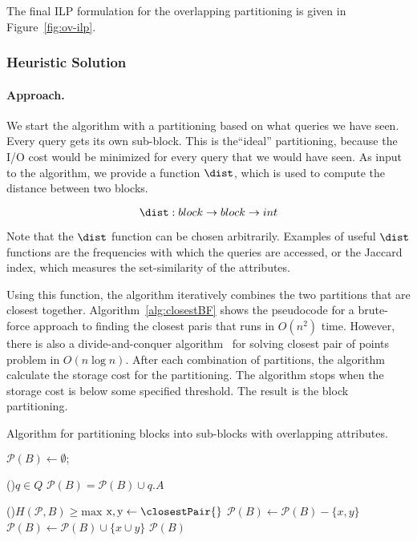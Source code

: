 The final ILP formulation for the overlapping partitioning is given in
Figure~\ref{fig:ov-ilp}.

\subsubsection{Heuristic Solution}

\paragraph*{Approach.$\,$} We start the algorithm with a 
 partitioning based on what queries we have seen.
Every query gets its own sub-block. This is the``ideal'' partitioning,
because the I/O cost would be minimized for every query that we would
have seen. As input to the algorithm, we provide a function $\dist$, which
is used to compute the distance between two blocks.

$$
\dist: block \rightarrow block \rightarrow int
$$

Note that the $\dist$ function can be chosen arbitrarily.  Examples of useful
$\dist$ functions are the frequencies with which the queries are accessed, or the Jaccard index, which measures the set-similarity of
the attributes.

Using this function, the algorithm iteratively combines the two partitions that
are closest together. Algorithm~\ref{alg:closestBF} shows the pseudocode for a brute-force approach
  to finding the closest paris that runs in $O(n^2)$ time. However, there is
  also a divide-and-conquer algorithm~\cite{cormen01} for solving closest pair
  of points problem in $O(n \log n)$.
After each combination of partitions, the algorithm calculate the storage cost
for the partitioning. The algorithm stops when the  storage cost is below some
specified threshold.  The result is the block partitioning.



\begin{algorithm}[ht]
\scriptsize
\caption{Algorithm for partitioning blocks into sub-blocks with overlapping attributes.}
\label{alg:closestPair}
$\mathcal{P}(B) \leftarrow \emptyset;$  

\For(){$q \in Q$}{ 
 $\mathcal{P}(B) = \mathcal{P}(B) \cup q.A$ 
}

\While(){$H(\mathcal{P}, B) \geq
  \text{max}$}{
$\text{x}, \text{y}  \leftarrow  \closestPair{}  $\;
 $ \mathcal{P}(B)  \leftarrow \mathcal{P}(B) - \{x, y\}$ \;
  $\mathcal{P}(B)  \leftarrow \mathcal{P}(B)  \cup \{ x \cup y \}$ \;
}
\Return $ \mathcal{P}(B)$  
\end{algorithm} 



